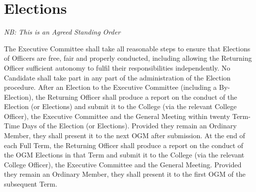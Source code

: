 \chapter{Elections}
\textit{NB: This is an Agreed Standing Order}

\npara The Executive Committee shall take all reasonable steps to ensure that Elections of Officers are free, fair and properly conducted, including allowing the Returning Officer sufficient autonomy to fulfil their responsibilities independently.
\npara No Candidate shall take part in any part of the administration of the Election procedure.
\npara After an Election to the Executive Committee (including a By-Election), the Returning Officer shall produce a report on the conduct of the Election (or Elections) and submit it to the College (via the relevant College Officer), the Executive Committee and the General Meeting within twenty Term-Time Days of the Election (or Elections).  Provided they remain an Ordinary Member, they shall present it to the next OGM after submission.
\npara At the end of each Full Term, the Returning Officer shall produce a report on the conduct of the OGM Elections in that Term and submit it to the College (via the relevant College Officer), the Executive Committee and the General Meeting.  Provided they remain an Ordinary Member, they shall present it to the first OGM of the subsequent Term.
